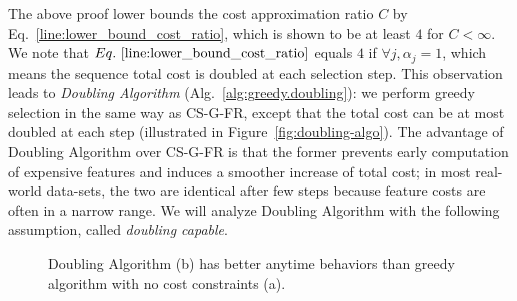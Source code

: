 The above proof lower bounds the cost approximation ratio $C$ by Eq.~\ref{line:lower_bound_cost_ratio}, which is shown to be at least $4$ for $C < \infty$. We note that $Eq.~\ref{line:lower_bound_cost_ratio}$ equals $4$ if $\forall j, \alpha_j = 1$, which means the sequence total cost is doubled at each selection step.
This observation leads to \textit{Doubling Algorithm} (Alg.~\ref{alg:greedy.doubling}): we perform greedy selection in the same way as CS-G-FR, except that the total cost can be at most doubled at each step (illustrated in Figure~\ref{fig:doubling-algo}). 
The advantage of Doubling Algorithm over 
CS-G-FR is that 
the former prevents early computation of expensive features and induces a smoother increase of total cost; in most real-world data-sets, the two are identical after few steps because 
feature costs are often in a narrow range. 
We will analyze Doubling Algorithm with the following assumption, called \textit{doubling capable}.

\begin{figure}
\centering
{}



\caption{Doubling Algorithm (b) has better anytime behaviors 
than greedy algorithm with no cost constraints (a).}
\label{fig:doubling}
\end{figure}


%  
%    

